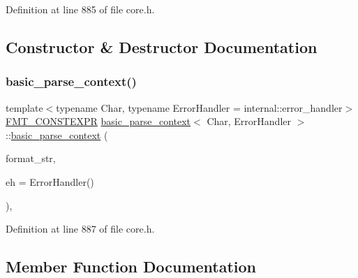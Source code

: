 Definition at line 885 of file core.\+h.



\subsection{Constructor \& Destructor Documentation}
\mbox{\label{classbasic__parse__context_a623fba02aeaad00d368fd18b61555466}} 
\subsubsection{\texorpdfstring{basic\+\_\+parse\+\_\+context()}{basic\_parse\_context()}}
{\footnotesize\ttfamily template$<$typename Char, typename Error\+Handler = internal\+::error\+\_\+handler$>$ \\
\hyperlink{core_8h_a69201cb276383873487bf68b4ef8b4cd}{F\+M\+T\+\_\+\+C\+O\+N\+S\+T\+E\+X\+PR} \hyperlink{classbasic__parse__context}{basic\+\_\+parse\+\_\+context}$<$ Char, Error\+Handler $>$\+::\hyperlink{classbasic__parse__context}{basic\+\_\+parse\+\_\+context} (\begin{DoxyParamCaption}\item[{\hyperlink{classbasic__string__view}{basic\+\_\+string\+\_\+view}$<$ Char $>$}]{format\+\_\+str,  }\item[{Error\+Handler}]{eh = {\ttfamily ErrorHandler()} }\end{DoxyParamCaption})\hspace{0.3cm}{\ttfamily [inline]}, {\ttfamily [explicit]}}



Definition at line 887 of file core.\+h.



\subsection{Member Function Documentation}
\mbox{\label{classbasic__parse__context_ad75183c1c2299c4a34f82265156fe99d}} 
